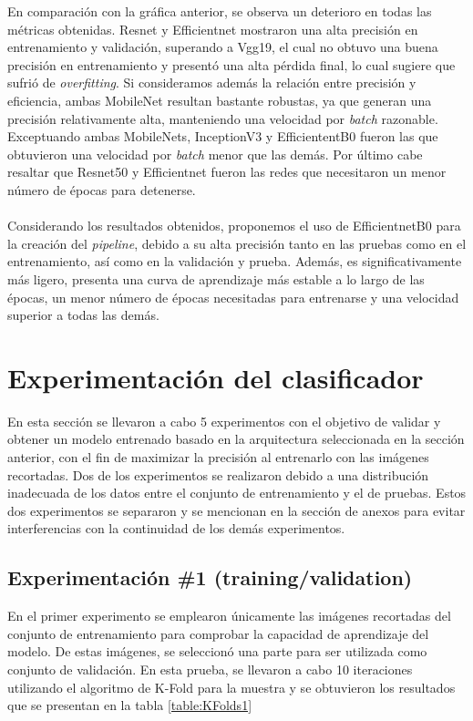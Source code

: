 En comparación con la gráfica anterior, se observa un deterioro en todas las métricas obtenidas. Resnet y Efficientnet mostraron una alta precisión en entrenamiento y validación, superando a Vgg19, el cual no obtuvo una buena precisión en entrenamiento y presentó una alta pérdida final, lo cual sugiere que sufrió de \textit{overfitting}. Si consideramos además la relación entre precisión y eficiencia, ambas MobileNet resultan bastante robustas, ya que generan una precisión relativamente alta, manteniendo una velocidad por \textit{batch} razonable. Exceptuando ambas MobileNets, InceptionV3 y EfficiententB0 fueron las que obtuvieron una velocidad por \textit{batch} menor que las demás. Por último cabe resaltar que Resnet50 y Efficientnet fueron las redes que necesitaron un menor número de épocas para detenerse. 
\\\\
Considerando los resultados obtenidos, proponemos el uso de EfficientnetB0 para la creación del \textit{pipeline}, debido a su alta precisión tanto en las pruebas como en el entrenamiento, así como en la validación y prueba. Además, es significativamente más ligero, presenta una curva de aprendizaje más estable a lo largo de las épocas, un menor número de épocas necesitadas para entrenarse y una velocidad superior a todas las demás.

\section{Experimentación del clasificador}

En esta sección se llevaron a cabo 5 experimentos con el objetivo de validar y obtener un modelo entrenado basado en la arquitectura seleccionada en la sección anterior, con el fin de maximizar la precisión al entrenarlo con las imágenes recortadas. Dos de los experimentos se realizaron debido a una distribución inadecuada de los datos entre el conjunto de entrenamiento y el de pruebas. Estos dos experimentos se separaron y se mencionan en la sección de anexos para evitar interferencias con la continuidad de los demás experimentos.
\subsection{Experimentación \#1 (training/validation)}

En el primer experimento se emplearon únicamente las imágenes recortadas del conjunto de entrenamiento para comprobar la capacidad de aprendizaje del modelo. De estas imágenes, se seleccionó una parte para ser utilizada como conjunto de validación. En esta prueba, se llevaron a cabo 10 iteraciones utilizando el algoritmo de K-Fold para la muestra y se obtuvieron los resultados que se presentan en la tabla \ref{table:KFolds1}
\\

